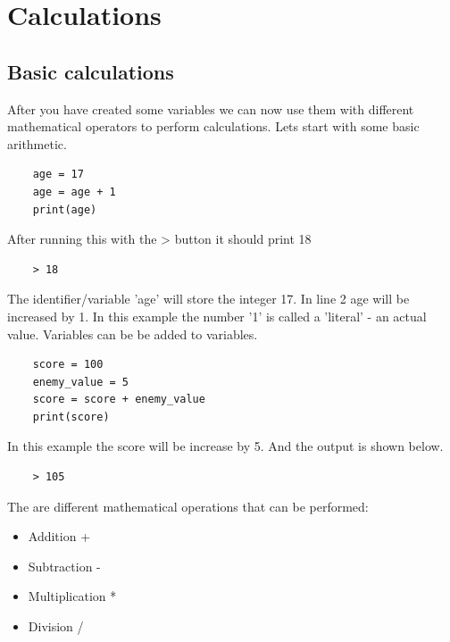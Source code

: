 \documentclass[12pt,a4paper, red]{bbe}
\begin{document}
    \setcounter{chapter}{1}
	\chapter{Calculations}
	
	\section{Basic calculations }
	
	After you have created some variables we can now use them with different mathematical operators to perform calculations. Lets start with some basic arithmetic.
	
	\vspace{5mm}
	
	\begin{lstlisting}
    age = 17
    age = age + 1
    print(age)\end{lstlisting}
	
    After running this with the > button it should print 18
    
    \begin{lstlisting}
    > 18\end{lstlisting}
    
    \vspace{5mm}
    
    
    The identifier/variable 'age' will store the integer 17. In line 2 age will be increased by 1.
    In this example the number '1' is called a 'literal' - an actual value. Variables can be be added to variables.
    
    \begin{lstlisting}
    score = 100
    enemy_value = 5
    score = score + enemy_value
    print(score)\end{lstlisting}
    
    In this example the score will be increase by 5. And the output is shown below.
    
    \begin{lstlisting}
    > 105\end{lstlisting}
    
    The are different mathematical operations that can be performed:
    \begin{itemize}[c]
	    \item Addition  +
	    \item Subtraction -
	    \item Multiplication *
	    \item Division /
	    
	\end{itemize}
	
\end{document}
